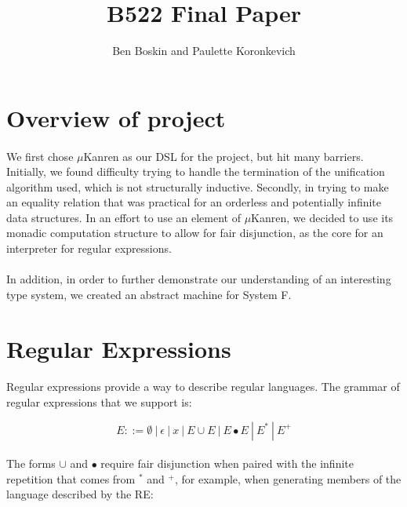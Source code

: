 \documentclass[12pt]{article}
\begin{document}
\title{B522 Final Paper}
\author{Ben Boskin and Paulette Koronkevich}
\maketitle


\section{Overview of project}
\paragraph{} We first chose $\mu$Kanren as our DSL for the project, but hit many barriers. Initially, we found difficulty trying to handle the termination of the unification algorithm used, which is not structurally inductive. Secondly, in trying to make an equality relation that was practical for an orderless and potentially infinite data structures. In an effort to use an element of $\mu$Kanren, we decided to use its monadic computation structure to allow for fair disjunction, as the core for an interpreter for regular expressions.
\paragraph{} In addition, in order to further demonstrate our understanding of an interesting type system, we created an abstract machine for System F.

\section{Regular Expressions}
\paragraph{} Regular expressions provide a way to describe regular languages. The grammar of regular expressions that we support is: 

$$E ::= \emptyset \ | \ \epsilon \ | \ x \ | \ E \cup E \ | \ E \bullet E \ | \ E^* \ | \ E^+ $$

\paragraph{} The forms $\cup$ and $\bullet$ require fair disjunction when paired with the  infinite repetition that comes from $^*$ and $^+$, for example, when generating members of the language described by the RE:
\end{document}
